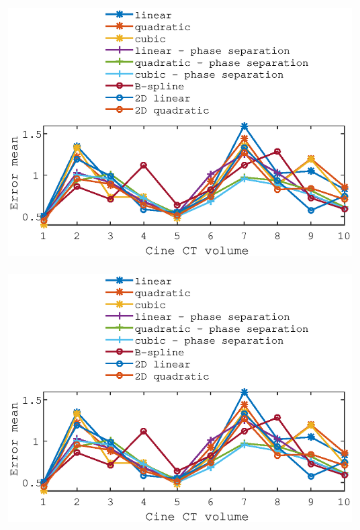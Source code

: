 \documentclass[11pt,a4paper,oneside]{report}
\begin{document}
\begin{figure}[H]
  \centering
  \begin{subfigure}[b]{0.33\textwidth}
    \includegraphics[width=\textwidth, trim=80 243 80 0,clip=true]{figures/task4/def_mean_error_couch1.eps}
  \end{subfigure}%
  \hspace{-3em}
  \begin{subfigure}[b]{0.33\textwidth}
    \includegraphics[width=\textwidth, trim=80 203 80 55,clip=true]{figures/task4/def_mean_error_couch1.eps}
  \end{subfigure}%
  \hspace{2em}
  \begin{subfigure}[b]{0.33\textwidth}

\end{subfigure}
\end{figure}
\end{document}
